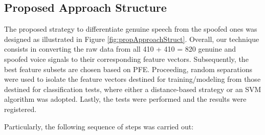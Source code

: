 \subsection{Proposed Approach Structure}
\par The proposed strategy to differentiate genuine speech from the spoofed ones was designed as illustrated in Figure \ref{fig:propApproachStruct}. Overall, our technique consists in converting the raw data from all 410 + 410 = 820 genuine and spoofed voice signals to their corresponding feature vectors. Subsequently, the best feature subsets are chosen based on PFE. Proceeding, random separations were used to isolate the feature vectors destined for training/modeling from those destined for classification tests, where either a distance-based strategy or an SVM algorithm \cite{bennett2000support} was adopted. Lastly, the tests were performed and the results were registered.
\\
\par Particularly, the following sequence of steps was carried out:
\newpage
